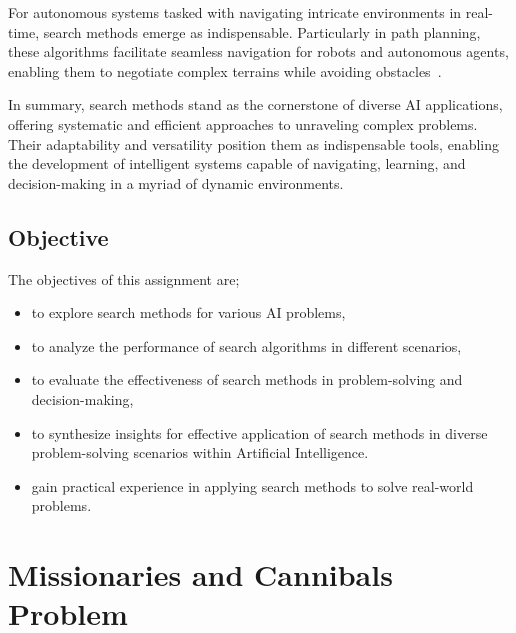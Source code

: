 \documentclass[12pt]{article}
\begin{document}
For autonomous systems tasked with navigating intricate environments in real-time, search methods emerge as indispensable. 
Particularly in path planning, these algorithms facilitate seamless navigation for robots and autonomous agents, enabling them 
to negotiate complex terrains while avoiding obstacles~\cite{poole1998computational}.

In summary, search methods stand as the cornerstone of diverse AI applications, offering systematic and efficient approaches 
to unraveling complex problems. Their adaptability and versatility position them as indispensable tools, enabling the development 
of intelligent systems capable of navigating, learning, and decision-making in a myriad of dynamic environments.


\subsection{Objective}

The objectives of this assignment are; 
\begin{itemize}
    \item to explore search methods for various AI problems,
    \item to analyze the performance of search algorithms in different scenarios,
    \item to evaluate the effectiveness of search methods in problem-solving and decision-making,
    \item to synthesize insights for effective application of search methods in diverse problem-solving scenarios within Artificial Intelligence.
    \item gain practical experience in applying search methods to solve real-world problems.
\end{itemize}

\section{Missionaries and Cannibals Problem}
\end{document}
